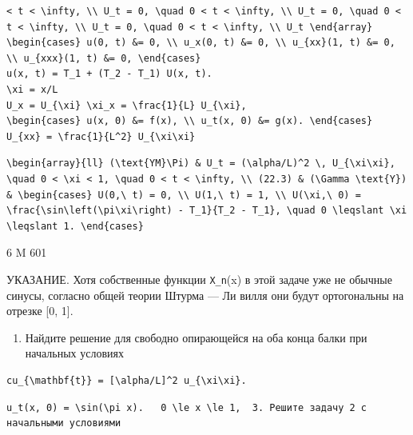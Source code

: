 \documentclass[
  ukrainian,
]{article}
\providecommand{\tightlist}{%
  \setlength{\itemsep}{0pt}\setlength{\parskip}{0pt}}
\begin{document}
\begin{verbatim}
< t < \infty, \\ U_t = 0, \quad 0 < t < \infty, \\ U_t = 0, \quad 0 < t < \infty, \\ U_t = 0, \quad 0 < t < \infty, \\ U_t \end{array}
\begin{cases} u(0, t) &= 0, \\ u_x(0, t) &= 0, \\ u_{xx}(1, t) &= 0, \\ u_{xxx}(1, t) &= 0, \end{cases}
u(x, t) = T_1 + (T_2 - T_1) U(x, t).
\xi = x/L
U_x = U_{\xi} \xi_x = \frac{1}{L} U_{\xi},
\begin{cases} u(x, 0) &= f(x), \\ u_t(x, 0) &= g(x). \end{cases}
U_{xx} = \frac{1}{L^2} U_{\xi\xi}
\end{verbatim}

\begin{verbatim}
\begin{array}{ll} (\text{YM}\Pi) & U_t = (\alpha/L)^2 \, U_{\xi\xi}, \quad 0 < \xi < 1, \quad 0 < t < \infty, \\ (22.3) & (\Gamma \text{Y}) & \begin{cases} U(0,\ t) = 0, \\ U(1,\ t) = 1, \\ U(\xi,\ 0) = \frac{\sin\left(\pi\xi\right) - T_1}{T_2 - T_1}, \quad 0 \leqslant \xi \leqslant 1. \end{cases}
\end{verbatim}

6 M 601

УКАЗАНИЕ. Хотя собственные функции \texttt{X\_n}(x) в этой задаче уже не
обычные синусы, согласно общей теории Штурма --- Ли вилля они будут
ортогональны на отрезке {[}0, 1{]}.

\begin{enumerate}
\def\labelenumi{\arabic{enumi}.}
\setcounter{enumi}{1}
\tightlist
\item
  Найдите решение для свободно опирающейся на оба конца балки при
  начальных условиях
\end{enumerate}

\begin{verbatim}
cu_{\mathbf{t}} = [\alpha/L]^2 u_{\xi\xi}.
\end{verbatim}

\begin{verbatim}
u_t(x, 0) = \sin(\pi x).   0 \le x \le 1,  3. Решите задачу 2 с начальными условиями
\end{verbatim}
\end{document}
